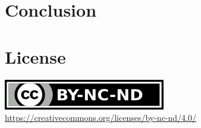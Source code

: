 \documentclass{amsart}
\theoremstyle{definition}
\theoremstyle{remark}
\numberwithin{equation}{section}
\begin{document}
\section{Conclusion}
\label{s:conclusion}





\begin{thebibliography}{10}

\end{thebibliography}
\section*{License}
\label{s:license}
\begin{center}
	\includegraphics{by-nc-nd.png} \\
	\url{https://creativecommons.org/licenses/by-nc-nd/4.0/}
\end{center}
\end{document}
